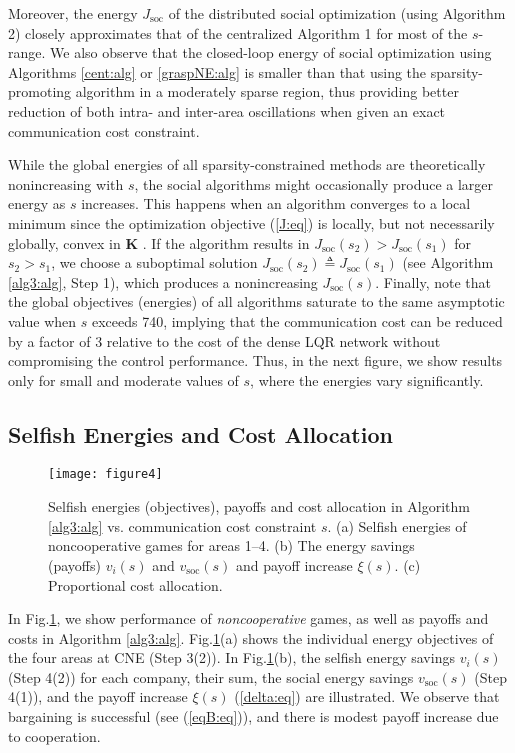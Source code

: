 \documentclass[12pt, draftclsnofoot,onecolumn]{IEEEtran}
\newcommand{\figfourwidth}{3.5in}
\newcommand{\figfourwidth}{4in}
\begin{document}
Moreover, the energy $J_{\mathrm{soc}}$ of the distributed social optimization (using Algorithm 2) closely approximates that of the centralized Algorithm 1 for most of the $s$-range. We also observe that the closed-loop energy of social optimization using Algorithms {\ref{cent:alg}} or {\ref{graspNE:alg}} is smaller than that using the sparsity-promoting algorithm in a moderately sparse region, thus providing better reduction of both intra- and inter-area oscillations when given an exact communication cost constraint.



While the global energies of all sparsity-constrained methods are theoretically nonincreasing with $s$, the social algorithms might occasionally produce a larger energy as $s$ increases. This happens when an algorithm converges to a local minimum since the optimization objective (\ref{J:eq}) is locally, but not necessarily globally, convex in $\boldsymbol{K}$ \cite{rautert1997computational}. If the algorithm results in $J_{\mathrm{soc}}(s_2){>} J_{\mathrm{soc}}(s_1)$ for $s_2{>}s_1$, we choose a suboptimal solution $J_{\mathrm{soc}}(s_2)\triangleq J_{\mathrm{soc}}(s_1)$ (see Algorithm \ref{alg3:alg}, Step 1), which produces a nonincreasing $J_{\mathrm{soc}}(s)$. Finally, note that the global objectives (energies) of all algorithms saturate to the same asymptotic value when $s$ exceeds 740, implying that the communication cost can be reduced by a factor of 3 relative to the cost of the dense LQR network without compromising the control performance. Thus, in the next figure, we show results only for small and moderate values of $s$, where the energies vary significantly.


\subsection{Selfish Energies and Cost Allocation}
\label{cost_alloc:sec}

\begin{figure}[!t]
\centering 
\texttt{[image: figure4]}
\caption{Selfish energies (objectives), payoffs and cost allocation in Algorithm \ref{alg3:alg} vs. communication cost constraint $s$. (a) Selfish energies of noncooperative games for areas 1--4. (b) The energy savings (payoffs) $v_i(s)$ and $v_{\mathrm{soc}}(s)$ and payoff increase $\xi(s)$. (c) Proportional cost allocation.}
\label{payoff:fig}
\end{figure}

In Fig.\ref{payoff:fig}, we show performance of {\it noncooperative} games, as well as payoffs and costs in Algorithm \ref{alg3:alg}. Fig.\ref{payoff:fig}(a) shows the individual energy objectives of the four areas at CNE (Step 3(2)). In Fig.\ref{payoff:fig}(b), the selfish energy savings $v_i(s)$ (Step 4(2)) for each company, their sum, the social energy savings $v_{\mathrm{soc}}(s)$ (Step 4(1)), and the payoff increase $\xi(s)$ (\ref{delta:eq}) are illustrated. We observe that bargaining is successful (see (\ref{eqB:eq})), and there is modest payoff increase due to cooperation. 
\end{document}
